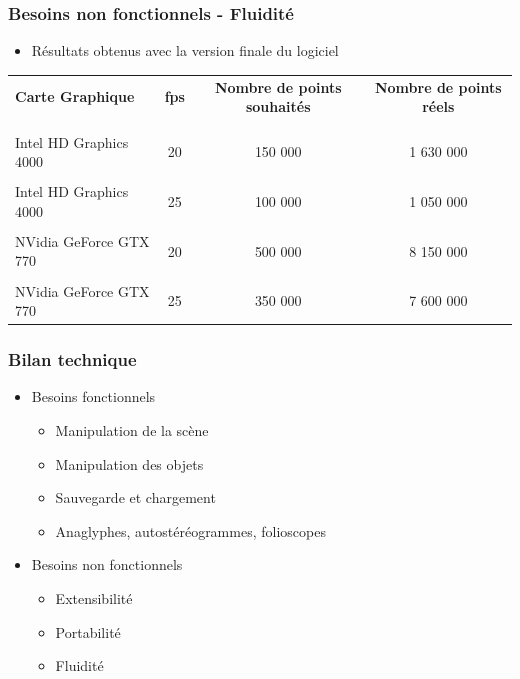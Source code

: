 \documentclass{beamer}
\begin{document}

\begin{frame}
\frametitle{Besoins non fonctionnels - Fluidité}
\begin{itemize}[label=$\bullet$]
\item Résultats obtenus avec la version finale du logiciel
\end{itemize}
{\fontsize{7}{8}\selectfont
{}
\begin{tabular}{lccc}

\textbf{Carte Graphique} & \textbf{fps} & \textbf{Nombre de points souhaités}& \textbf{Nombre de points réels}\\
\\
\hline
\\
Intel HD Graphics 4000 &
20 & 150 000 &  1 630 000\\
\hline
\\
Intel HD Graphics 4000 &
25 & 
100 000 & 1 050 000 \\
\hline
\\
NVidia GeForce GTX 770 & 20 & 500 000 & 8 150 000\\
\hline
\\
NVidia GeForce GTX 770 & 25 &
350 000 & 7 600 000\\

\end{tabular}
}

\end{frame}


\begin{frame}
\frametitle{Bilan technique}
\begin{itemize}[label=$\bullet$]
\item Besoins fonctionnels
	\begin{itemize}[label=$\checkmark$]
	\item Manipulation de la scène
	\item Manipulation des objets
	\item Sauvegarde et chargement
	\item Anaglyphes, autostéréogrammes, folioscopes
	\end{itemize}
\item Besoins non fonctionnels
	\begin{itemize}[label=$\checkmark$]
	\item Extensibilité
	\item Portabilité  
	\item Fluidité
	\end{itemize}
\end{itemize}

\end{frame}
\end{document}

